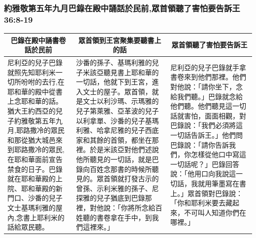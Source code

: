 \subsubsection{約雅敬第五年九月巴錄在殿中誦話於民前,眾首領聽了害怕要告訴王 36:8-19}
 \begin{table}[H]
\centering
\begin{tabular}{p{4.5cm}|p{6.5cm}|p{5.50cm}}\hline\hline
\multicolumn{1}{c|}{巴錄在殿中誦書卷話於民前}&\multicolumn{1}{c|}{眾首領到王宮聚集要聽書上的話}&\multicolumn{1}{c}{眾首領聽了害怕要告訴王}\\\hline
尼利亞的兒子巴錄就照先知耶利米一切所吩咐的去行,在耶和華的殿中從書上念耶和華的話。猶大王約西亞的兒子約雅敬第五年九月,耶路撒冷的眾民和那從猶大城邑來到耶路撒冷的眾民,在耶和華面前宣告禁食的日子。巴錄就在耶和華殿的上院、耶和華殿的新門口、沙番的兒子文士基瑪利雅的屋內,念書上耶利米的話給眾民聽。
&沙番的孫子、基瑪利雅的兒子米該亞聽見書上耶和華的一切話，他就下到王宮，進入文士的屋子。眾首領，就是文士以利沙瑪、示瑪雅的兒子第萊雅、亞革波的兒子以利拿單、沙番的兒子基瑪利雅、哈拿尼雅的兒子西底家和其餘的首領，都坐在那裡。於是米該亞對他們述說他所聽見的一切話，就是巴錄向百姓念那書的時候所聽見的。眾首領就打發古示的曾孫、示利米雅的孫子、尼探雅的兒子猶底到巴錄那裡，對他說：「你將所念給百姓聽的書卷拿在手中，到我們這裡來。」
&尼利亞的兒子巴錄就手拿書卷來到他們那裡。他們對他說：「請你坐下，念給我們聽。」巴錄就念給他們聽。他們聽見這一切話就害怕，面面相觀，對巴錄說：「我們必須將這一切話告訴王。」他們問巴錄說：「請你告訴我們，你怎樣從他口中寫這一切話呢？」巴錄回答說：「他用口向我說這一切話，我就用筆墨寫在書上。」眾首領對巴錄說：「你和耶利米要去藏起來，不可叫人知道你們在哪裡。」\\\hline
\end{tabular}
\end{table}




